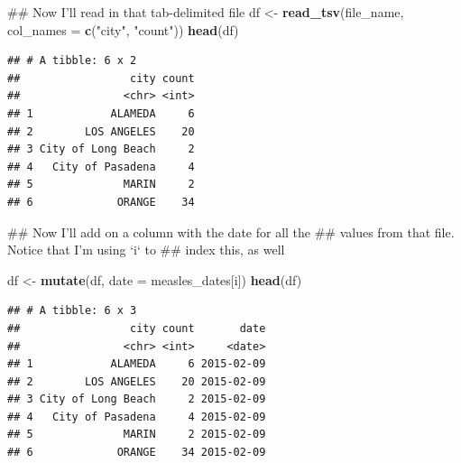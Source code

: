 \documentclass[]{book}
\makeatletter
\newenvironment{Shaded}{\begin{snugshade}}{\end{snugshade}}
\newcommand{\KeywordTok}[1]{\textcolor[rgb]{0.13,0.29,0.53}{\textbf{#1}}}
\newcommand{\DataTypeTok}[1]{\textcolor[rgb]{0.13,0.29,0.53}{#1}}
\newcommand{\StringTok}[1]{\textcolor[rgb]{0.31,0.60,0.02}{#1}}
\newcommand{\NormalTok}[1]{#1}
\newenvironment{kframe}{%
\medskip{}
\setlength{\fboxsep}{.8em}
 \def\at@end@of@kframe{}%
 \ifinner\ifhmode%
  \def\at@end@of@kframe{\end{minipage}}%
  \begin{minipage}{\columnwidth}%
 \fi\fi%
 \def\FrameCommand##1{\hskip\@totalleftmargin \hskip-\fboxsep
 \colorbox{shadecolor}{##1}\hskip-\fboxsep
     \hskip-\linewidth \hskip-\@totalleftmargin \hskip\columnwidth}%
 \MakeFramed {\advance\hsize-\width
   \@totalleftmargin\z@ \linewidth\hsize
   \@setminipage}}%
 {\par\unskip\endMakeFramed%
 \at@end@of@kframe}
\renewenvironment{Shaded}{\begin{kframe}}{\end{kframe}}
\theoremstyle{definition}
\theoremstyle{definition}
\theoremstyle{definition}
\theoremstyle{remark}
\makeatother
\begin{document}
\begin{Shaded}
\begin{Highlighting}[]
\NormalTok{## Now I'll read in that tab-delimited file}
\NormalTok{df <-}\StringTok{ }\KeywordTok{read_tsv}\NormalTok{(file_name, }\DataTypeTok{col_names =} \KeywordTok{c}\NormalTok{(}\StringTok{"city"}\NormalTok{, }\StringTok{"count"}\NormalTok{))}
\KeywordTok{head}\NormalTok{(df)}
\end{Highlighting}
\end{Shaded}

\begin{verbatim}
## # A tibble: 6 x 2
##                 city count
##                <chr> <int>
## 1            ALAMEDA     6
## 2        LOS ANGELES    20
## 3 City of Long Beach     2
## 4   City of Pasadena     4
## 5              MARIN     2
## 6             ORANGE    34
\end{verbatim}

\begin{Shaded}
\begin{Highlighting}[]
\NormalTok{## Now I'll add on a column with the date for all the }
\NormalTok{## values from that file. Notice that I'm using `i` to }
\NormalTok{## index this, as well}

\NormalTok{df <-}\StringTok{ }\KeywordTok{mutate}\NormalTok{(df, }\DataTypeTok{date =}\NormalTok{ measles_dates[i])}
\KeywordTok{head}\NormalTok{(df)}
\end{Highlighting}
\end{Shaded}

\begin{verbatim}
## # A tibble: 6 x 3
##                 city count       date
##                <chr> <int>     <date>
## 1            ALAMEDA     6 2015-02-09
## 2        LOS ANGELES    20 2015-02-09
## 3 City of Long Beach     2 2015-02-09
## 4   City of Pasadena     4 2015-02-09
## 5              MARIN     2 2015-02-09
## 6             ORANGE    34 2015-02-09
\end{verbatim}
\end{document}

